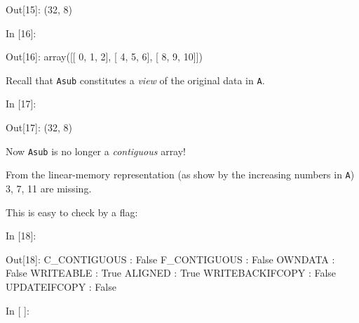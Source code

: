 \begin{BGVerbatim}[commandchars=\\\{\}]
{\color{outcolor}Out[{\color{outcolor}15}]:} (32, 8)
\end{BGVerbatim}
            
    \begin{BGVerbatim}[commandchars=\\\{\}]
{\color{incolor}In [{\color{incolor}16}]:}   \PY{p}{[} \PY{p}{]}
\end{BGVerbatim}

\begin{BGVerbatim}[commandchars=\\\{\}]
{\color{outcolor}Out[{\color{outcolor}16}]:} array([[ 0,  1,  2],
                [ 4,  5,  6],
                [ 8,  9, 10]])
\end{BGVerbatim}
            
    Recall that \texttt{Asub} constitutes a \emph{view} of the original data
in \texttt{A}.

    \begin{BGVerbatim}[commandchars=\\\{\}]
{\color{incolor}In [{\color{incolor}17}]:} 
\end{BGVerbatim}

\begin{BGVerbatim}[commandchars=\\\{\}]
{\color{outcolor}Out[{\color{outcolor}17}]:} (32, 8)
\end{BGVerbatim}
            
    Now \texttt{Asub} is no longer a \emph{contiguous} array!

From the linear-memory representation (as show by the increasing numbers
in \texttt{A}) 3, 7, 11 are missing.

This is easy to check by a flag:

    \begin{BGVerbatim}[commandchars=\\\{\}]
{\color{incolor}In [{\color{incolor}18}]:} 
\end{BGVerbatim}

\begin{BGVerbatim}[commandchars=\\\{\}]
{\color{outcolor}Out[{\color{outcolor}18}]:}   C\_CONTIGUOUS : False
           F\_CONTIGUOUS : False
           OWNDATA : False
           WRITEABLE : True
           ALIGNED : True
           WRITEBACKIFCOPY : False
           UPDATEIFCOPY : False
\end{BGVerbatim}
            
    \begin{BGVerbatim}[commandchars=\\\{\}]
{\color{incolor}In [{\color{incolor} }]:} 
\end{BGVerbatim}


